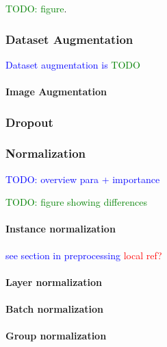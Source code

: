 \textcolor{green}{TODO: figure}.

\subsubsection{Dataset Augmentation}

\textcolor{blue}{Dataset augmentation is \textcolor{green}{TODO}}

\paragraph{Image Augmentation}



\subsubsection{Dropout}




\subsubsection{Normalization}

\textcolor{blue}{TODO: overview para + importance}

\textcolor{green}{TODO: figure showing differences}

\paragraph{Instance normalization}

\textcolor{blue}{see section in preprocessing \textcolor{red}{local ref?}}

\paragraph{Layer normalization}

\paragraph{Batch normalization}

\paragraph{Group normalization}